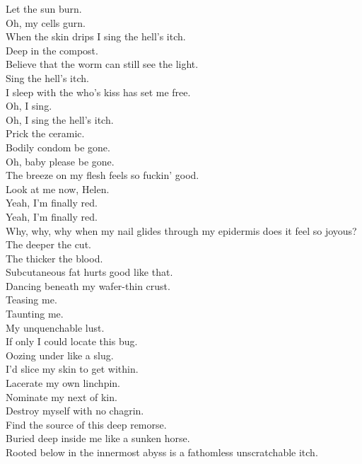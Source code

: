 Let the sun burn. \\
Oh, my cells gurn. \\
When the skin drips I sing the hell's itch. \\
Deep in the compost. \\
Believe that the worm can still see the light. \\
Sing the hell's itch. \\
I sleep with the  who's kiss has set me free. \\
Oh, I sing. \\
Oh, I sing the hell's itch. \\
Prick the ceramic. \\
Bodily condom be gone. \\
Oh, baby please be gone. \\
The breeze on my flesh feels so fuckin' good. \\
Look at me now, Helen. \\
Yeah, I'm finally red. \\
Yeah, I'm finally red. \\

Why, why, why when my nail glides through my epidermis does it feel so joyous? \\
The deeper the cut. \\
The thicker the blood. \\
Subcutaneous fat hurts good like that. \\
Dancing beneath my wafer-thin crust. \\
Teasing me. \\
Taunting me. \\
My unquenchable lust. \\
If only I could locate this bug. \\
Oozing under like a slug. \\
I'd slice my skin to get within. \\
Lacerate my own linchpin. \\
Nominate my next of kin. \\
Destroy myself with no chagrin. \\
Find the source of this deep remorse. \\
Buried deep inside me like a sunken horse. \\
Rooted below in the innermost abyss is a fathomless unscratchable itch. \\


